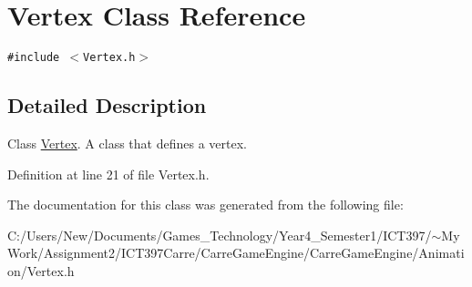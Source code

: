 \hypertarget{class_vertex}{
\section{Vertex Class Reference}
\label{class_vertex}
}
{\tt \#include $<$Vertex.h$>$}



\subsection{Detailed Description}
Class \hyperlink{class_vertex}{Vertex}. A class that defines a vertex. 

Definition at line 21 of file Vertex.h.

The documentation for this class was generated from the following file:\begin{CompactItemize}
\item 
C:/Users/New/Documents/Games\_\-Technology/Year4\_\-Semester1/ICT397/$\sim$My Work/Assignment2/ICT397Carre/CarreGameEngine/CarreGameEngine/Animation/Vertex.h\end{CompactItemize}
